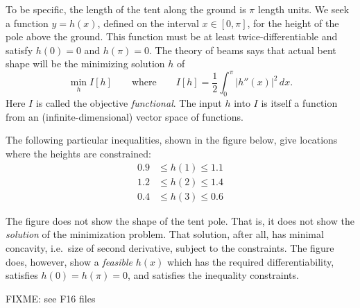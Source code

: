 \documentclass[11pt]{amsart}
\begin{document}
\begin{enumerate}
To be specific, the length of the tent along the ground is $\pi$ length units.  We seek a function $y=h(x)$, defined on the interval $x\in[0,\pi]$, for the height of the pole above the ground.  This function must be at least twice-differentiable and satisfy $h(0)=0$ and $h(\pi)=0$.  The theory of beams says that actual bent shape will be the minimizing solution $h$ of
    $$\min_h I[h] \qquad \text{where} \qquad I[h] = \frac{1}{2} \int_0^\pi |h''(x)|^2\,dx.$$
Here $I$ is called the objective \emph{functional}.  The input $h$ into $I$ is itself a function from an (infinite-dimensional) vector space of functions.

The following particular inequalities, shown in the figure below, give locations where the heights are constrained:
\begin{align*}
0.9 &\le h(1) \le 1.1 \\
1.2 &\le h(2) \le 1.4 \\
0.4 &\le h(3) \le 0.6
\end{align*}

The figure does not show the shape of the tent pole.  That is, it does not show the \emph{solution} of the minimization problem.  That solution, after all, has minimal concavity, i.e.~size of second derivative, subject to the constraints.  The figure does, however, show a \emph{feasible} $h(x)$ which has the required differentiability, satisfies $h(0)=h(\pi)=0$, and satisfies the inequality constraints.

\bigskip
\begin{center}
FIXME: see F16 files
\end{center}

\end{enumerate}
\end{document}
